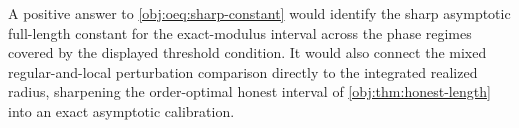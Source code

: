 A positive answer to \cref{obj:oeq:sharp-constant} would identify the sharp asymptotic full-length constant for the exact-modulus interval across the phase regimes covered by the displayed threshold condition. It would also connect the mixed regular-and-local perturbation comparison directly to the integrated realized radius, sharpening the order-optimal honest interval of \cref{obj:thm:honest-length} into an exact asymptotic calibration.
